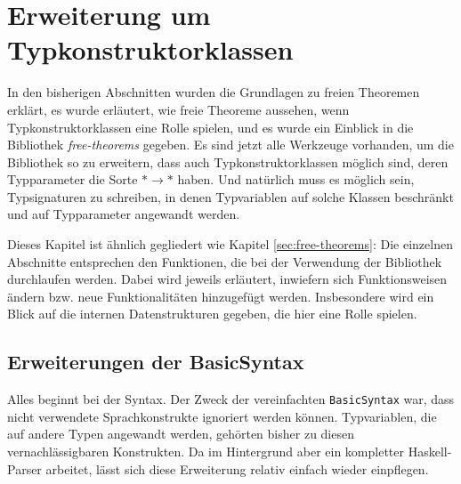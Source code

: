 \section{Erweiterung um Typkonstruktorklassen}

\label{sec:erweiterung-um-typklassen}

In den bisherigen Abschnitten wurden die Grundlagen zu freien Theoremen erklärt, es wurde erläutert, wie freie Theoreme
aussehen, wenn Typkonstruktorklassen eine Rolle spielen, und es wurde ein Einblick in die Bibliothek \textit{free-theorems}
gegeben. Es sind jetzt alle Werkzeuge vorhanden, um die Bibliothek so zu erweitern, dass auch Typkonstruktorklassen möglich
sind, deren Typparameter die Sorte $* \rightarrow *$ haben. Und natürlich muss es möglich sein, Typsignaturen zu schreiben,
in denen Typvariablen auf solche Klassen beschränkt und auf Typparameter angewandt werden.

Dieses Kapitel ist ähnlich gegliedert wie Kapitel \ref{sec:free-theorems}: Die einzelnen Abschnitte entsprechen den Funktionen,
die bei der Verwendung der Bibliothek durchlaufen werden. Dabei wird jeweils erläutert, inwiefern sich Funktionsweisen ändern
bzw. neue Funktionalitäten hinzugefügt werden. Insbesondere wird ein Blick auf die internen Datenstrukturen gegeben,
die hier eine Rolle spielen.


\subsection{Erweiterungen der BasicSyntax}

Alles beginnt bei der Syntax. Der Zweck der vereinfachten \texttt{BasicSyntax} war, dass nicht verwendete Sprachkonstrukte
ignoriert werden können. Typvariablen, die auf andere Typen angewandt werden, gehörten bisher zu diesen vernachlässigbaren
Konstrukten. Da im Hintergrund aber ein kompletter Haskell-Parser arbeitet, lässt sich diese Erweiterung relativ einfach
wieder einpflegen.

